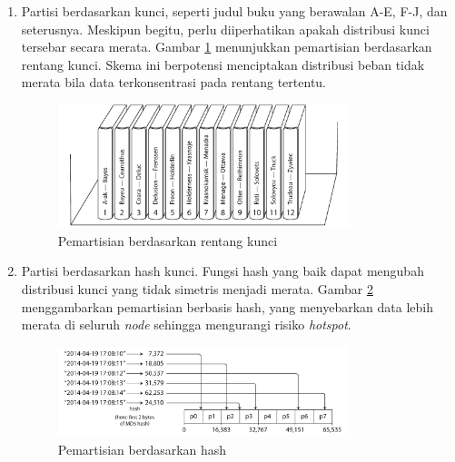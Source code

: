 \begin{enumerate}
    \item Partisi berdasarkan kunci, seperti judul buku yang berawalan A-E, F-J, dan seterusnya. Meskipun begitu, perlu diiperhatikan apakah distribusi kunci tersebar secara merata. Gambar \ref{fig:partition-by-key-range} menunjukkan pemartisian berdasarkan rentang kunci. Skema ini berpotensi menciptakan distribusi beban tidak merata bila data terkonsentrasi pada rentang tertentu.
          \begin{figure}[H]
              \centering
              \includegraphics[width=0.8\textwidth]{resources/chapter-2/partition-by-key-range.png}
              \caption{Pemartisian berdasarkan rentang kunci \parencite{dataIntensiveApplications}}
              \label{fig:partition-by-key-range}
          \end{figure}

    \item Partisi berdasarkan hash kunci. Fungsi hash yang baik dapat mengubah distribusi kunci yang tidak simetris menjadi merata. Gambar \ref{fig:partition-by-hash} menggambarkan pemartisian berbasis hash, yang menyebarkan data lebih merata di seluruh \textit{node} sehingga mengurangi risiko \textit{hotspot}.
          \begin{figure}[H]
              \centering
              \includegraphics[width=0.8\textwidth]{resources/chapter-2/partition-by-hash.png}
              \caption{Pemartisian berdasarkan hash \parencite{dataIntensiveApplications}}
              \label{fig:partition-by-hash}
          \end{figure}

\end{enumerate}